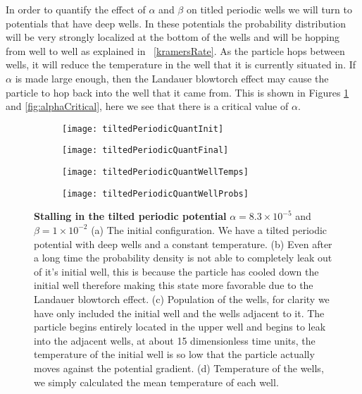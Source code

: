 In order to quantify the effect of $\alpha$ and $\beta$ on titled periodic wells we will turn to potentials that have deep wells. In these potentials the probability distribution will be very strongly localized at the bottom of the wells and will be hopping from well to well as explained in ~\autoref{kramersRate}. As the particle hops between wells, it will reduce the temperature in the well that it is currently situated in. If $\alpha$ is made large enough, then the Landauer blowtorch effect may cause the particle to hop back into the well that it came from. This is shown in Figures \ref{fig:tiltedPeriodicQuant} and \ref{fig:alphaCritical}, here we see that there is a critical value of $\alpha$.
\begin{figure}
	\begin{subfigure}{0.49\textwidth}
		\texttt{[image: tiltedPeriodicQuantInit]}
		\caption{}
	\end{subfigure}
	\begin{subfigure}{0.49\textwidth}
		\texttt{[image: tiltedPeriodicQuantFinal]}
		\caption{}
	\end{subfigure}
	\begin{subfigure}{0.49\textwidth}
		\texttt{[image: tiltedPeriodicQuantWellTemps]}
		\caption{}
	\end{subfigure}
	\begin{subfigure}{0.49\textwidth}
		\texttt{[image: tiltedPeriodicQuantWellProbs]}
		\caption{}
	\end{subfigure}
	\caption{\textbf{Stalling in the tilted periodic potential} $\alpha = 8.3 \times 10^{-5}$ and $\beta = 1 \times 10^{-2}$ (a) The initial configuration. We have a tilted periodic potential with deep wells and a constant temperature. (b) Even after a long time the probability density is not able to completely leak out of it's initial well, this is because the particle has cooled down the initial well therefore making this state more favorable due to the Landauer blowtorch effect. (c) Population of the wells, for clarity we have only included the initial well and the wells adjacent to it. The particle begins entirely located in the upper well and begins to leak into the adjacent wells, at about 15 dimensionless time units, the temperature of the initial well is so low that the particle actually moves against the potential gradient. (d) Temperature of the wells, we simply calculated the mean temperature of each well. \label{fig:tiltedPeriodicQuant}}
\end{figure}
